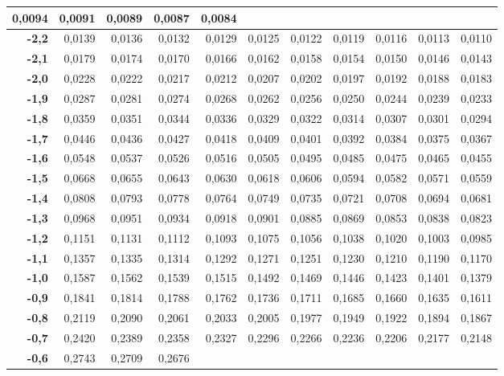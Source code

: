 \documentclass[a4paper]{article}
\begin{document}
\begin{center}
\begin{tabular}{|r||r|r|r|r|r|r|r|r|r|r|}
0,0094& 
0,0091& 
0,0089& 
0,0087& 
0,0084 \\
\hline
\textbf{-2,2}& 
0,0139& 
0,0136& 
0,0132& 
0,0129& 
0,0125& 
0,0122& 
0,0119& 
0,0116& 
0,0113& 
0,0110 \\
\hline
\textbf{-2,1}& 
0,0179& 
0,0174& 
0,0170& 
0,0166& 
0,0162& 
0,0158& 
0,0154& 
0,0150& 
0,0146& 
0,0143 \\
\hline
\textbf{-2,0}& 
0,0228& 
0,0222& 
0,0217& 
0,0212& 
0,0207& 
0,0202& 
0,0197& 
0,0192& 
0,0188& 
0,0183 \\
\hline
\textbf{-1,9}& 
0,0287& 
0,0281& 
0,0274& 
0,0268& 
0,0262& 
0,0256& 
0,0250& 
0,0244& 
0,0239& 
0,0233 \\
\hline
\textbf{-1,8}& 
0,0359& 
0,0351& 
0,0344& 
0,0336& 
0,0329& 
0,0322& 
0,0314& 
0,0307& 
0,0301& 
0,0294 \\
\hline
\textbf{-1,7}& 
0,0446& 
0,0436& 
0,0427& 
0,0418& 
0,0409& 
0,0401& 
0,0392& 
0,0384& 
0,0375& 
0,0367 \\
\hline
\textbf{-1,6}& 
0,0548& 
0,0537& 
0,0526& 
0,0516& 
0,0505& 
0,0495& 
0,0485& 
0,0475& 
0,0465& 
0,0455 \\
\hline
\textbf{-1,5}& 
0,0668& 
0,0655& 
0,0643& 
0,0630& 
0,0618& 
0,0606& 
0,0594& 
0,0582& 
0,0571& 
0,0559 \\
\hline
\textbf{-1,4}& 
0,0808& 
0,0793& 
0,0778& 
0,0764& 
0,0749& 
0,0735& 
0,0721& 
0,0708& 
0,0694& 
0,0681 \\
\hline
\textbf{-1,3}& 
0,0968& 
0,0951& 
0,0934& 
0,0918& 
0,0901& 
0,0885& 
0,0869& 
0,0853& 
0,0838& 
0,0823 \\
\hline
\textbf{-1,2}& 
0,1151& 
0,1131& 
0,1112& 
0,1093& 
0,1075& 
0,1056& 
0,1038& 
0,1020& 
0,1003& 
0,0985 \\
\hline
\textbf{-1,1}& 
0,1357& 
0,1335& 
0,1314& 
0,1292& 
0,1271& 
0,1251& 
0,1230& 
0,1210& 
0,1190& 
0,1170 \\
\hline
\textbf{-1,0}& 
0,1587& 
0,1562& 
0,1539& 
0,1515& 
0,1492& 
0,1469& 
0,1446& 
0,1423& 
0,1401& 
0,1379 \\
\hline
\textbf{-0,9}& 
0,1841& 
0,1814& 
0,1788& 
0,1762& 
0,1736& 
0,1711& 
0,1685& 
0,1660& 
0,1635& 
0,1611 \\
\hline
\textbf{-0,8}& 
0,2119& 
0,2090& 
0,2061& 
0,2033& 
0,2005& 
0,1977& 
0,1949& 
0,1922& 
0,1894& 
0,1867 \\
\hline
\textbf{-0,7}& 
0,2420& 
0,2389& 
0,2358& 
0,2327& 
0,2296& 
0,2266& 
0,2236& 
0,2206& 
0,2177& 
0,2148 \\
\hline
\textbf{-0,6}& 
0,2743& 
0,2709& 
0,2676& 

\end{tabular}
\end{center}
\end{document}
